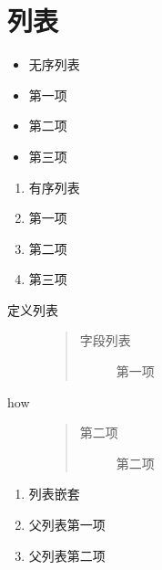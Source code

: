 \documentclass[letterpaper,10pt,english]{sphinxmanual}
\begin{document}
\section{列表}
\label{\detokenize{rst-text:list}}\label{\detokenize{rst-text:id7}}\begin{itemize}
\item {} 
\sphinxAtStartPar
无序列表

\item {} 
\sphinxAtStartPar
第一项

\item {} 
\sphinxAtStartPar
第二项

\item {} 
\sphinxAtStartPar
第三项

\end{itemize}
\begin{enumerate}
%
\item {} 
\sphinxAtStartPar
有序列表

\item {} 
\sphinxAtStartPar
第一项

\item {} 
\sphinxAtStartPar
第二项

\item {} 
\sphinxAtStartPar
第三项

\end{enumerate}
\begin{description}
\item[{定义列表}] \leavevmode\begin{quote}\begin{description}
\item[{字段列表}] \leavevmode
\sphinxAtStartPar
第一项

\end{description}\end{quote}

\item[{how}] \leavevmode\begin{quote}\begin{description}
\item[{第二项}] \leavevmode
\sphinxAtStartPar
第二项

\end{description}\end{quote}

\end{description}
\begin{enumerate}
%
\item {} 
\sphinxAtStartPar
列表嵌套

\item {} 
\sphinxAtStartPar
父列表第一项

\item {} 
\sphinxAtStartPar
父列表第二项

\end{enumerate}
\end{document}
